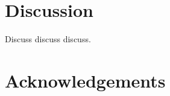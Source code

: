 \documentclass[a4paper,11pt]{article}
\begin{document}
\section{Discussion}
Discuss discuss discuss.
\section*{Acknowledgements}


\end{document}
